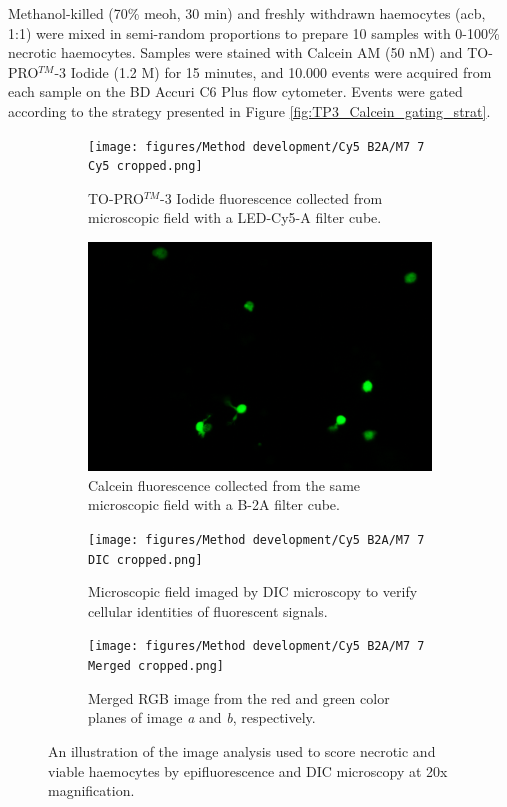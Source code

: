 Methanol-killed (70\% \acrshort{meoh}, 30 min) and freshly withdrawn haemocytes (\acrshort{acb}, 1:1) were mixed in semi-random proportions to prepare 10 samples with 0-100\% necrotic haemocytes. Samples were stained with Calcein AM (50 nM) and TO-PRO$^{TM}$-3 Iodide (1.2 \micro M) for 15 minutes, and 10.000 events were acquired from each sample on the BD Accuri C6 Plus flow cytometer. Events were gated according to the strategy presented in Figure \ref{fig:TP3_Calcein_gating_strat}.

\begin{figure}[H]
    \centering
    \begin{subfigure}[b]{.45\textwidth}
        \centering
        \texttt{[image: figures/Method development/Cy5 B2A/M7 7 Cy5 cropped.png]}
        \caption{TO-PRO$^{TM}$-3 Iodide fluorescence collected from microscopic field with a LED-Cy5-A filter cube.}
        \label{subfig:a}
    \end{subfigure}
    \hfill
    \begin{subfigure}[b]{.45\textwidth}
        \centering
        \includegraphics[width=\textwidth]{figures/Method development/Cy5 B2A/M7 7 B2A cropped.png}
        \caption{Calcein fluorescence collected from the same microscopic field with a B-2A filter cube.}
        \label{subfig:b}
    \end{subfigure}
    \newline
    \begin{subfigure}[b]{.45\textwidth}
        \centering
        \texttt{[image: figures/Method development/Cy5 B2A/M7 7 DIC cropped.png]}
        \caption{Microscopic field imaged by DIC microscopy to verify cellular identities of fluorescent signals.}
        \label{subfig:c}
    \end{subfigure}
    \hfill
    \begin{subfigure}[b]{.45\textwidth}
        \centering
        \texttt{[image: figures/Method development/Cy5 B2A/M7 7 Merged cropped.png]}
        \caption{Merged RGB image from the red and green color planes of image \emph{a} and \emph{b}, respectively.}
        \label{subfig:d}
    \end{subfigure}
    \caption{An illustration of the image analysis used to score necrotic and viable haemocytes by epifluorescence and DIC microscopy at 20x magnification.}
    \label{fig:Epifluorescent_scoring}
\end{figure}

